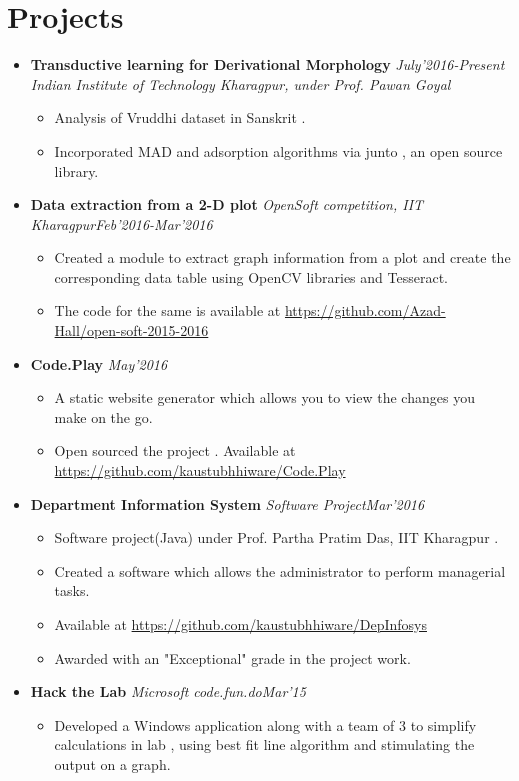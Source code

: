 \documentclass[11pt,a4paper]{moderncv}
\newcommand{\experience}[4]{
  \vspace{0.1cm}
\item \textbf{\large{#1}} \textit{#2}\hfill\textit{#3}
  \begin{itemize}[leftmargin=*]
    \setlength\itemsep{0em} #4
  \end{itemize}
}
\newcommand{\experiencetwo}[4]{
  \vspace{0.1cm}
\item \textbf{\large{#1}} \hfill\textit{#3}\\\textit{#2}
  \begin{itemize}[leftmargin=*]
    \setlength\itemsep{0em} #4
  \end{itemize}
}
\begin{document}
\section*{Projects}
\begin{itemize}
  \setlength\itemsep{0.5em}

  \experiencetwo{Transductive learning for Derivational Morphology}{Indian Institute of Technology Kharagpur, under Prof. Pawan Goyal}{July'2016-Present}{
   \item Analysis of Vruddhi dataset in Sanskrit .
   \item Incorporated MAD and adsorption algorithms via junto , an open source library.
  }

  \experience{Data extraction from a 2-D plot}{OpenSoft competition, IIT Kharagpur}{Feb'2016-Mar'2016}{
  \item Created a module to extract graph information from a plot and create the corresponding data table using OpenCV libraries and Tesseract.
  \item The code for the same is available at \url{https://github.com/Azad-Hall/open-soft-2015-2016}
  }
  
  \experiencetwo{Code.Play}{}{May'2016}{
  \item A static website generator which allows you to view the changes you make on the go.
  \item Open sourced the project . Available at \url{https://github.com/kaustubhhiware/Code.Play}
  }

  \experience{Department Information System}{Software Project}{Mar'2016}{
  \item Software project(Java) under Prof. Partha Pratim Das, IIT Kharagpur .
  \item Created a software which allows the administrator to perform managerial tasks.
  \item Available at \url{https://github.com/kaustubhhiware/DepInfosys}
  \item Awarded with an "Exceptional" grade in the project work.
  }

  \experience{Hack the Lab}{Microsoft code.fun.do}{Mar'15}{
  \item   Developed a Windows application along  with a team of 3 to simplify calculations in lab , using best fit line algorithm and stimulating the output on a graph.
  }

\end{itemize}
\end{document}
